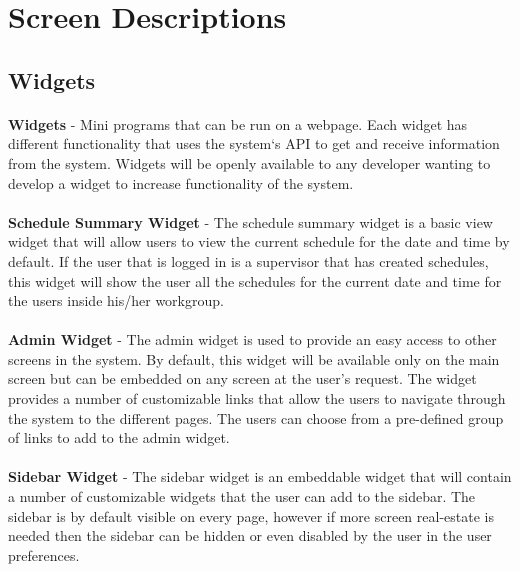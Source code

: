 \documentclass[letterpaper,12pt]{report}
\begin{document}
\newpage
\section{Screen Descriptions}

\subsection{Widgets}

\paragraph*{}\hspace{0.6cm}\textbf{Widgets} - Mini programs that can be run on a webpage. Each widget has different functionality that uses the system`s API to get and receive information from the system. Widgets will be openly available to any developer wanting to develop a widget to increase functionality of the system.
\paragraph*{}\hspace{0.6cm}\textbf{Schedule Summary Widget} - The schedule summary widget is a basic view widget that will allow users to view the current schedule for the date and time by default. If the user that is logged in is a supervisor that has created schedules, this widget will show the user all the schedules for the current date and time for the users inside his/her workgroup.
\paragraph*{}\hspace{0.6cm}\textbf{Admin Widget} - The admin widget is used to provide an easy access to other screens in the system. By default, this widget will be available only on the main screen but can be embedded on any screen at the user’s request. The widget provides a number of customizable links that allow the users to navigate through the system to the different pages. The users can choose from a pre-defined group of links to add to the admin widget. 
\paragraph*{}\hspace{0.6cm}\textbf{Sidebar Widget} - The sidebar widget is an embeddable widget that will contain a number of customizable widgets that the user can add to the sidebar. The sidebar is by default visible on every page, however if more screen real-estate is needed then the sidebar can be hidden or even disabled by the user in the user preferences.
\end{document}
